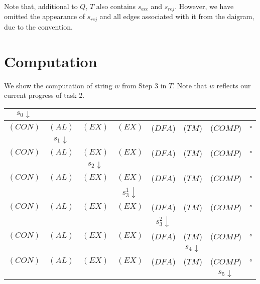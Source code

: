 \documentclass{article}
\begin{document}
Note that, additional to $Q$, $T$ also contains $s_{acc}$ and $s_{rej}$. However, we have omitted
the appearance of $s_{rej}$ and all edges associated with it from the daigram, due to the
convention.

\section*{Computation}

We show the computation of string $w$ from Step 3 in $T$. Note that $w$ reflects our current
progress of task 2.

\begin{center}
  \begin{tabular}{|c|c|c|c|c|c|c|c|}
    \hline
    \multicolumn{1}{|c}{$s_0\downarrow$} &  \multicolumn{7}{c|}{\phantom{A}}\\
    \hline
    $(CON)$ & $(AL)$  & $(EX)$ & $(EX)$ & ($DFA$) & ($TM$) & ($COMP$) & $\square$\\
    \hline
    \multicolumn{1}{|c}{\phantom{A}} & \multicolumn{1}{c}{$s_1\downarrow$} & \multicolumn{6}{c|}{\phantom{A}}\\
    \hline
    $(CON)$ & $(AL)$  & $(EX)$ & $(EX)$ & ($DFA$) & ($TM$) & ($COMP$) & $\square$\\
    \hline
    \multicolumn{2}{|c}{\phantom{A}} & \multicolumn{1}{c}{$s_2\downarrow$} & \multicolumn{5}{c|}{\phantom{A}}\\
    \hline
    $(CON)$ & $(AL)$  & $(EX)$ & $(EX)$ & ($DFA$) & ($TM$) & ($COMP$) & $\square$\\
    \hline
    \multicolumn{3}{|c}{\phantom{A}} & \multicolumn{1}{c}{$s_3^1\downarrow$} & \multicolumn{4}{c|}{\phantom{A}}\\
    \hline
    $(CON)$ & $(AL)$  & $(EX)$ & $(EX)$ & ($DFA$) & ($TM$) & ($COMP$) & $\square$\\
    \hline
    \multicolumn{4}{|c}{\phantom{A}} & \multicolumn{1}{c}{$s_3^2\downarrow$} & \multicolumn{3}{c|}{\phantom{A}}\\          
    \hline
    $(CON)$ & $(AL)$  & $(EX)$ & $(EX)$ & ($DFA$) & ($TM$) & ($COMP$) & $\square$\\
    \hline
    \multicolumn{5}{|c}{\phantom{A}} & \multicolumn{1}{c}{$s_4\downarrow$} & \multicolumn{2}{c|}{\phantom{A}}\\          
    \hline
    $(CON)$ & $(AL)$  & $(EX)$ & $(EX)$ & ($DFA$) & ($TM$) & ($COMP$) & $\square$\\
    \hline
    \multicolumn{6}{|c}{\phantom{A}} & \multicolumn{1}{c}{$s_5\downarrow$} & \multicolumn{1}{c|}{\phantom{A}}\\          

\end{tabular}
\end{center}
\end{document}
